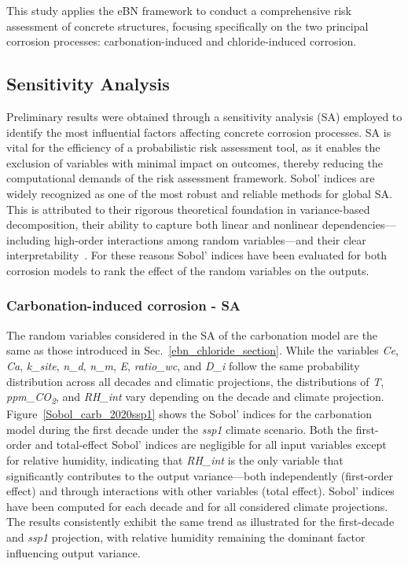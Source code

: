
This study applies the eBN framework to conduct a comprehensive risk assessment of concrete structures, focusing specifically on the two principal corrosion processes: carbonation-induced and chloride-induced corrosion. 

\subsection{Sensitivity Analysis}
Preliminary results were obtained through a sensitivity analysis (SA) employed to identify the most influential factors affecting concrete corrosion processes.
SA is vital for the efficiency of a probabilistic risk assessment tool, as it enables the exclusion of variables with minimal impact on outcomes, thereby reducing the computational demands of the risk assessment framework.
Sobol' indices are widely recognized as one of the most robust and reliable methods for global SA. 
This is attributed to their rigorous theoretical foundation in variance-based decomposition, their ability to capture both linear and nonlinear dependencies—including high-order interactions among random variables—and their clear interpretability~\cite{Sobols_indices_SOBOL}.
For these reasons Sobol' indices have been evaluated for both corrosion models to rank the effect of the random variables on the outputs. 

\subsubsection{Carbonation-induced corrosion - SA}\label{SA_carbonation}
The random variables considered in the SA of the carbonation model are the same as those introduced in Sec.~\ref{ebn_chloride_section}. 
While the variables \textit{Ce}, \textit{Ca}, \textit{k\_site}, \textit{n\_d}, \textit{n\_m}, \textit{E}, \textit{ratio\_wc}, and \textit{D\_i} follow the same probability distribution across all decades and climatic projections, the distributions of \textit{T}, \textit{ppm\_CO\textsubscript{2}}, and \textit{RH\_int} vary depending on the decade and climate projection. \\ 
Figure~\ref{Sobol_carb_2020ssp1} shows the Sobol' indices for the carbonation model during the first decade under the \textit{ssp1} climate scenario. 
Both the first-order and total-effect Sobol' indices are negligible for all input variables except for relative humidity, indicating that \textit{RH\_int} is the only variable that significantly contributes to the output variance—both independently (first-order effect) and through interactions with other variables (total effect).
Sobol' indices have been computed for each decade and for all considered climate projections. The results consistently exhibit the same trend as illustrated for the first-decade and \textit{ssp1} projection, with relative humidity remaining the dominant factor influencing output variance. 

